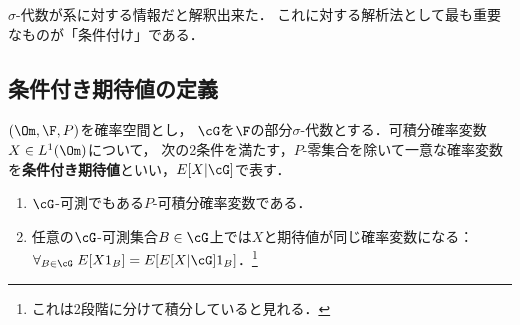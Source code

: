 \documentclass[uplatex,dvipdfmx]{jsreport}
\begin{document}
\begin{tcolorbox}[colframe=ForestGreen, colback=ForestGreen!10!white,breakable,colbacktitle=ForestGreen!40!white,coltitle=black,fonttitle=\bfseries\sffamily,
title=]
    $\sigma$-代数が系に対する情報だと解釈出来た．
    これに対する解析法として最も重要なものが「条件付け」である．
\end{tcolorbox}

\subsection{条件付き期待値の定義}

\begin{definition}
    $(\Om,\F,P)$を確率空間とし，
    $\cG$を$\F$の部分$\sigma$-代数とする．可積分確率変数$X\in L^1(\Om)$について，
    次の2条件を満たす，$P$-零集合を除いて一意な確率変数を\textbf{条件付き期待値}といい，$E[X|\cG]$で表す．
    \begin{enumerate}
        \item $\cG$-可測でもある$P$-可積分確率変数である．
        \item 任意の$\cG$-可測集合$B\in\cG$上では$X$と期待値が同じ確率変数になる：
        $\forall_{B\in\cG}\;E[X1_B]=E[E[X|\cG]1_B]$．\footnote{これは2段階に分けて積分していると見れる．}
    \end{enumerate}
\end{definition}
\end{document}
